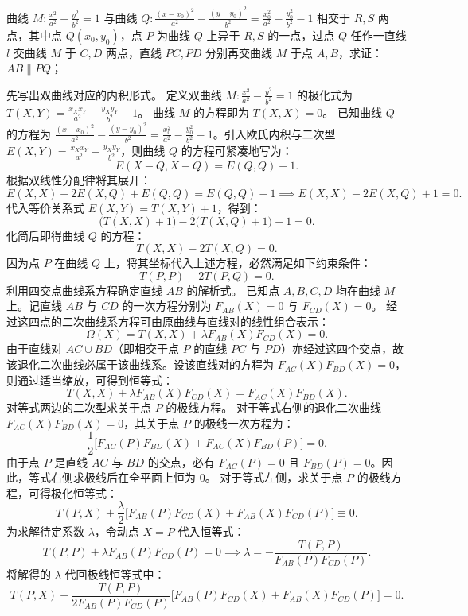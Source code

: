 \begin{example}
曲线 \(M: \frac{x^2}{a^2} - \frac{y^2}{b^2} = 1\) 与曲线 \(Q: \frac{(x-x_0)^2}{a^2} - \frac{(y-y_0)^2}{b^2} = \frac{x_0^2}{a^2} - \frac{y_0^2}{b^2} - 1\) 相交于 \(R,S\) 两点，其中点 \(Q(x_0,y_0)\)，点 \(P\) 为曲线 \(Q\) 上异于 \(R,S\) 的一点，过点 \(Q\) 任作一直线 \(l\) 交曲线 \(M\) 于 \(C,D\) 两点，直线 \(PC,PD\) 分别再交曲线 \(M\) 于点 \(A,B\)，求证：\(AB \parallel PQ\)；
\end{example}
\begin{solution}
先写出双曲线对应的内积形式。
定义双曲线 $M: \frac{x^2}{a^2} - \frac{y^2}{b^2} = 1$ 的极化式为 $T(X, Y) = \frac{x_X x_Y}{a^2} - \frac{y_X y_Y}{b^2} - 1$。
曲线 $M$ 的方程即为 $T(X, X) = 0$。
已知曲线 $Q$ 的方程为 $\frac{(x-x_0)^2}{a^2} - \frac{(y-y_0)^2}{b^2} = \frac{x_0^2}{a^2} - \frac{y_0^2}{b^2} - 1$。引入欧氏内积与二次型 $E(X,Y) = \frac{x_X x_Y}{a^2} - \frac{y_X y_Y}{b^2}$，则曲线 $Q$ 的方程可紧凑地写为：
\[ E(X-Q, X-Q) = E(Q, Q) - 1. \]
根据双线性分配律将其展开：
\[ E(X, X) - 2E(X, Q) + E(Q, Q) = E(Q, Q) - 1 \implies E(X, X) - 2E(X, Q) + 1 = 0. \]
代入等价关系式 $E(X, Y) = T(X, Y) + 1$，得到：
\[ \big(T(X, X) + 1\big) - 2\big(T(X, Q) + 1\big) + 1 = 0. \]
化简后即得曲线 $Q$ 的方程：
\[ T(X, X) - 2T(X, Q) = 0. \]
因为点 $P$ 在曲线 $Q$ 上，将其坐标代入上述方程，必然满足如下约束条件：
\[ T(P, P) - 2T(P, Q) = 0. \]
利用四交点曲线系方程确定直线 $AB$ 的解析式。
已知点 $A, B, C, D$ 均在曲线 $M$ 上。记直线 $AB$ 与 $CD$ 的一次方程分别为 $F_{AB}(X) = 0$ 与 $F_{CD}(X) = 0$。
经过这四点的二次曲线系方程可由原曲线与直线对的线性组合表示：
\[ \Omega(X) = T(X, X) + \lambda F_{AB}(X) F_{CD}(X) = 0. \]
由于直线对 $AC \cup BD$（即相交于点 $P$ 的直线 $PC$ 与 $PD$）亦经过这四个交点，故该退化二次曲线必属于该曲线系。设该直线对的方程为 $F_{AC}(X) F_{BD}(X) = 0$，则通过适当缩放，可得到恒等式：
\[ T(X, X) + \lambda F_{AB}(X) F_{CD}(X) = F_{AC}(X) F_{BD}(X). \]
对等式两边的二次型求关于点 $P$ 的极线方程。
对于等式右侧的退化二次曲线 $F_{AC}(X) F_{BD}(X) = 0$，其关于点 $P$ 的极线一次方程为：
\[ \frac{1}{2} \big[ F_{AC}(P) F_{BD}(X) + F_{AC}(X) F_{BD}(P) \big] = 0. \]
由于点 $P$ 是直线 $AC$ 与 $BD$ 的交点，必有 $F_{AC}(P) = 0$ 且 $F_{BD}(P) = 0$。因此，等式右侧求极线后在全平面上恒为 $0$。
对于等式左侧，求关于点 $P$ 的极线方程，可得极化恒等式：
\[ T(P, X) + \frac{\lambda}{2} \big[ F_{AB}(P) F_{CD}(X) + F_{AB}(X) F_{CD}(P) \big] \equiv 0. \]
为求解待定系数 $\lambda$，令动点 $X = P$ 代入恒等式：
\[ T(P, P) + \lambda F_{AB}(P) F_{CD}(P) = 0 \implies \lambda = -\frac{T(P, P)}{F_{AB}(P) F_{CD}(P)}. \]
将解得的 $\lambda$ 代回极线恒等式中：
\[ T(P, X) - \frac{T(P, P)}{2F_{AB}(P) F_{CD}(P)} \big[ F_{AB}(P) F_{CD}(X) + F_{AB}(X) F_{CD}(P) \big] = 0. \]

\end{solution}
